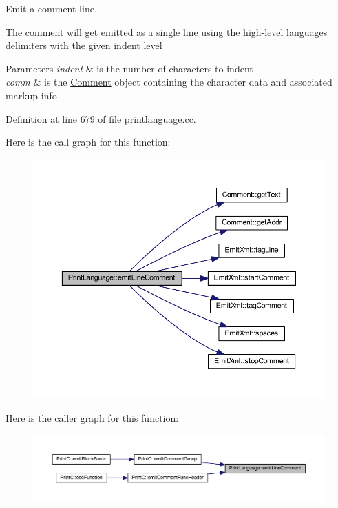 Emit a comment line. 

The comment will get emitted as a single line using the high-\/level language\textquotesingle{}s delimiters with the given indent level 
\begin{DoxyParams}{Parameters}
{\em indent} & is the number of characters to indent \\
\hline
{\em comm} & is the \mbox{\hyperlink{class_comment}{Comment}} object containing the character data and associated markup info \\
\hline
\end{DoxyParams}


Definition at line 679 of file printlanguage.\+cc.

Here is the call graph for this function\+:
\nopagebreak
\begin{figure}[H]
\begin{center}
\leavevmode
\includegraphics[width=350pt]{class_print_language_ae98ff6bbfded046b5177d9c6e728b99b_cgraph}
\end{center}
\end{figure}
Here is the caller graph for this function\+:
\nopagebreak
\begin{figure}[H]
\begin{center}
\leavevmode
\includegraphics[width=350pt]{class_print_language_ae98ff6bbfded046b5177d9c6e728b99b_icgraph}
\end{center}
\end{figure}
\mbox{\label{class_print_language_a61cfb2515689f57d3d3b5895b52ef078}} 
